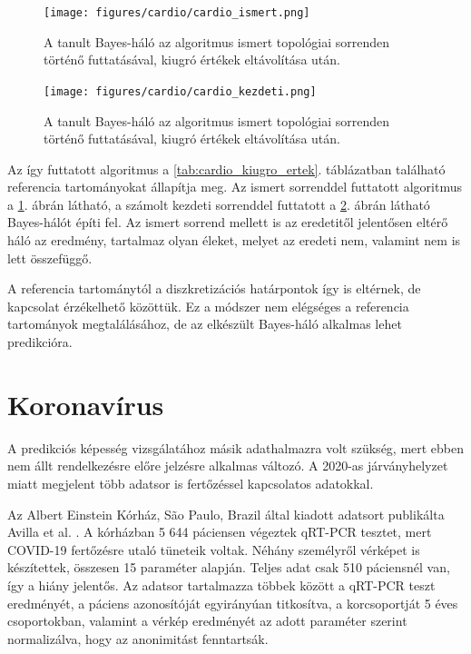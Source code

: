 \begin{figure}[htp]
    \centering
    \texttt{[image: figures/cardio/cardio\_ismert.png]}
    \caption{A tanult Bayes-háló az algoritmus ismert topológiai sorrenden történő futtatásával, kiugró értékek eltávolítása után.}
    \label{fig:cardio_kiugro_ertek}
\end{figure}

\begin{figure}[htp]
    \centering
    \texttt{[image: figures/cardio/cardio\_kezdeti.png]}
    \caption{A tanult Bayes-háló az algoritmus ismert topológiai sorrenden történő futtatásával, kiugró értékek eltávolítása után.}
    \label{fig:cardio_kiugro_ertek_kezdeti}
\end{figure}

Az így futtatott algoritmus a \ref{tab:cardio_kiugro_ertek}. táblázatban található referencia tartományokat állapítja meg. Az ismert sorrenddel futtatott algoritmus a \ref{fig:cardio_kiugro_ertek}. ábrán látható, a számolt kezdeti sorrenddel futtatott a \ref{fig:cardio_kiugro_ertek_kezdeti}. ábrán látható Bayes-hálót építi fel. Az ismert sorrend mellett is az eredetitől jelentősen eltérő háló az eredmény, tartalmaz olyan éleket, melyet az eredeti nem, valamint nem is lett összefüggő.

A referencia tartománytól a diszkretizációs határpontok így is eltérnek, de kapcsolat érzékelhető közöttük. Ez a módszer nem elégséges a referencia tartományok megtalálásához, de az elkészült Bayes-háló alkalmas lehet predikcióra.

\section{Koronavírus}
A predikciós képesség vizsgálatához másik adathalmazra volt szükség, mert ebben nem állt rendelkezésre előre jelzésre alkalmas változó. A 2020-as járványhelyzet miatt megjelent több adatsor is fertőzéssel kapcsolatos adatokkal.

Az Albert Einstein Kórház, São Paulo, Brazil által kiadott adatsort publikálta Avilla et al. \cite{avila2020hemogram}. A kórházban 5 644 páciensen végeztek qRT-PCR tesztet, mert COVID-19 fertőzésre utaló tüneteik voltak. Néhány személyről vérképet is készítettek, összesen 15 paraméter alapján. Teljes adat csak 510 páciensnél van, így a hiány jelentős. Az adatsor tartalmazza többek között a qRT-PCR teszt eredményét, a páciens azonosítóját egyirányúan titkosítva, a korcsoportját 5 éves csoportokban, valamint a vérkép eredményét az adott paraméter szerint normalizálva, hogy az anonimitást fenntartsák.

